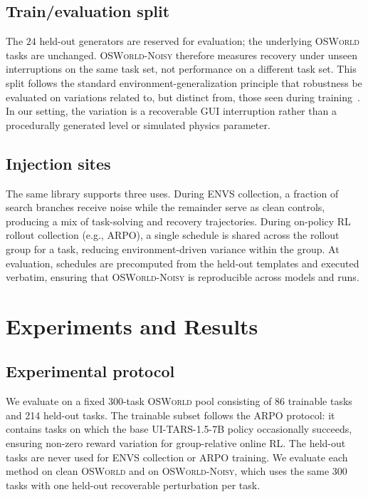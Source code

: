 \documentclass[11pt]{article}
\begin{document}
\subsection{Train/evaluation split}

The $24$ held-out generators are reserved for evaluation; the
underlying \textsc{OSWorld} tasks are unchanged. \textsc{OSWorld-Noisy}
therefore measures recovery under unseen interruptions on the same
task set, not performance on a different task set. This split follows
the standard environment-generalization principle that robustness be
evaluated on variations related to, but distinct from, those seen
during training~\citep{cobbe2020procgen,jiang2021plr,dennis2020paired,parkerholder2022accel}.
In our setting, the variation is a recoverable GUI interruption
rather than a procedurally generated level or simulated physics
parameter.

\subsection{Injection sites}

The same library supports three uses. During ENVS collection, a
fraction of search branches receive noise while the remainder serve
as clean controls, producing a mix of task-solving and recovery
trajectories. During on-policy RL rollout collection (e.g., ARPO), a
single schedule is shared across the rollout group for a task,
reducing environment-driven variance within the group. At evaluation,
schedules are precomputed from the held-out templates and executed
verbatim, ensuring that \textsc{OSWorld-Noisy} is reproducible across
models and runs.


\section{Experiments and Results}
\label{sec:experiments}

\subsection{Experimental protocol}
\label{sec:exp_protocol}

We evaluate on a fixed 300-task \textsc{OSWorld} pool consisting of
86 trainable tasks and 214 held-out tasks. The trainable subset follows
the ARPO protocol: it contains tasks on which the base UI-TARS-1.5-7B
policy occasionally succeeds, ensuring non-zero reward variation for
group-relative online RL. The held-out tasks are never used for ENVS
collection or ARPO training. We evaluate each method on clean
\textsc{OSWorld} and on \textsc{OSWorld-Noisy}, which uses the same
300 tasks with one held-out recoverable perturbation per task.
\end{document}
